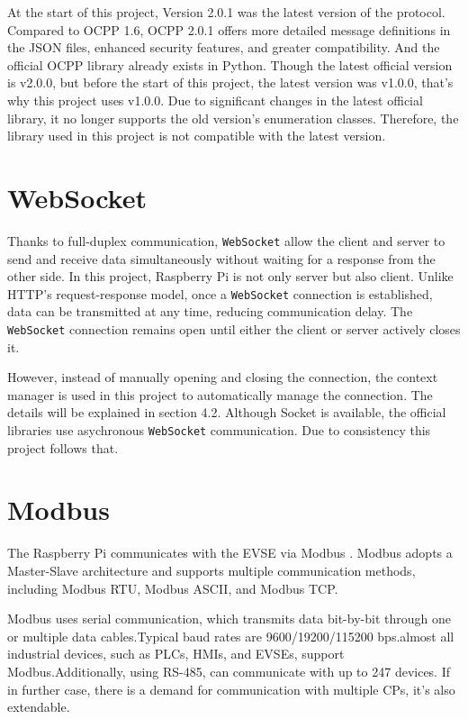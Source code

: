 \documentclass[
english,
ruledheaders=section,%
class=report,%
thesis={type=Report},%
accentcolor=9c,%
custommargins=true,%
marginpar=false,%
parskip=half-,%
fontsize=11pt,%
logofile={img/tuda_logo.pdf}, %
]{tudapub}
\begin{document}
    At the start of this project, Version 2.0.1 was the latest version of the protocol. Compared to OCPP 1.6, OCPP 2.0.1 offers more detailed message definitions in the JSON files, enhanced security features, and greater compatibility. And the official OCPP library already exists in Python.\cite{ocpplibrary} Though the latest official version is v2.0.0, but before the start of this project, the latest version was v1.0.0, that's why this project uses v1.0.0. Due to significant changes in the latest official library, it no longer supports the old version's enumeration classes. Therefore, the library used in this project is not compatible with the latest version.


    \section{WebSocket}
    \label{sec:websocketIntroduction}

    Thanks to full-duplex communication, \texttt{WebSocket} allow the client and server to send and receive data simultaneously without waiting for a response from the other side. In this project, Raspberry Pi is not only server but also client. Unlike HTTP’s request-response model, once a \texttt{WebSocket} connection is established, data can be transmitted at any time, reducing communication delay.\cite{websockets}  The \texttt{WebSocket} connection remains open until either the client or server actively closes it.

    However, instead of manually opening and closing the connection, the context manager is used in this project to automatically manage the connection. The details will be explained in section 4.2. Although Socket is available, the official libraries use asychronous \texttt{WebSocket} communication. Due to consistency this project follows that.


    \section{Modbus}
    \label{sec:modbusIntroduction}

    The Raspberry Pi communicates with the EVSE via Modbus . Modbus adopts a Master-Slave architecture and supports multiple communication methods, including Modbus RTU, Modbus ASCII, and Modbus TCP.\cite{modbus}

    Modbus uses serial communication, which transmits data bit-by-bit through one or multiple data cables.Typical baud rates are 9600/19200/115200 bps.almost all industrial devices, such as PLCs, HMIs, and EVSEs, support Modbus.Additionally, using RS-485, can communicate with up to 247 devices. If in further case, there is a demand for communication with multiple CPs, it's also extendable.
\end{document}

